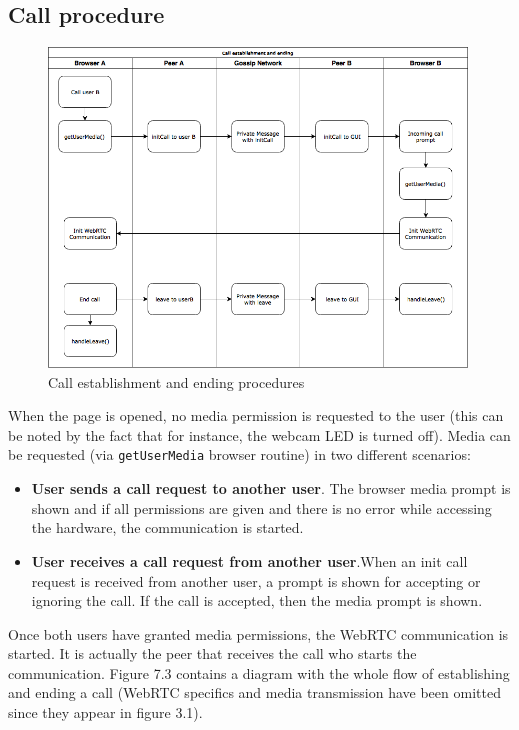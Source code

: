 \documentclass[paper=a4, fontsize=11pt]{scrartcl} %
\numberwithin{equation}{section} %
\numberwithin{figure}{section} %
\numberwithin{table}{section} %
\begin{document}
\subsection{Call procedure}

\begin{figure}[ht!]
	\centering
	\includegraphics[width=420px]{call-establishment-ending.png}
	\caption{Call establishment and ending procedures}
\end{figure}

When the page is opened, no media permission is requested to the user (this can be noted by the fact that for instance, the webcam LED is turned off). Media can be requested (via \verb|getUserMedia| browser routine) in two different scenarios:

\begin{itemize}
	\item \textbf{User sends a call request to another user}. The browser media prompt is shown and if all permissions are given and there is no error while accessing the hardware, the communication is started.
	\item \textbf{User receives a call request from another user}.When an init call request is received from another user, a prompt is shown for accepting or ignoring the call. If the call is accepted, then the media prompt is shown.
\end{itemize}

Once both users have granted media permissions, the WebRTC communication is started. It is actually the peer that receives the call who starts the communication. Figure 7.3 contains a diagram with the whole flow of establishing and ending a call (WebRTC specifics and media transmission have been omitted since they appear in figure 3.1).
\end{document}
